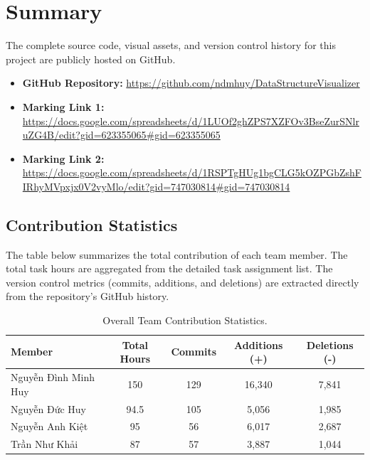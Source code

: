 \section*{Summary}


The complete source code, visual assets, and version control history for this project are publicly hosted on GitHub.
\begin{itemize}
    \item \textbf{GitHub Repository:} \url{https://github.com/ndmhuy/DataStructureVisualizer}
    \item \textbf{Marking Link 1:} \url{https://docs.google.com/spreadsheets/d/1LUOf2ghZPS7XZFOv3BseZurSNlruZG4B/edit?gid=623355065#gid=623355065}
    \item \textbf{Marking Link 2:} \url{https://docs.google.com/spreadsheets/d/1RSPTgHUg1bgCLG5kOZPGbZshFIRhyMVpxjx0V2vyMlo/edit?gid=747030814#gid=747030814}
\end{itemize}


\subsection*{Contribution Statistics}


The table below summarizes the total contribution of each team member. The total task hours are aggregated from the detailed task assignment list. The version control metrics (commits, additions, and deletions) are extracted directly from the repository's GitHub history.


\begin{table}[h!]
    \centering
    \renewcommand{\arraystretch}{1.5}
    \begin{tabular}{|l|c|c|c|c|}
        \hline
        \textbf{Member} & \textbf{Total Hours} & \textbf{Commits} & \textbf{Additions (+)} & \textbf{Deletions (-)} \\ \hline
        Nguyễn Đình Minh Huy & 150 & 129 & 16,340 & 7,841 \\ \hline
        Nguyễn Đức Huy & 94.5 & 105 & 5,056 & 1,985 \\ \hline
        Nguyễn Anh Kiệt & 95 & 56 & 6,017 & 2,687 \\ \hline
        Trần Như Khải & 87 & 57 & 3,887 & 1,044 \\ \hline
    \end{tabular}
    \caption{Overall Team Contribution Statistics.}
\end{table}
